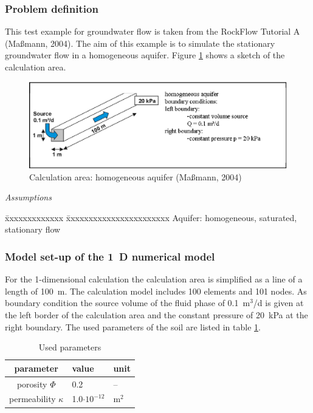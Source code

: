 
\subsubsection*{Problem definition}

This test example for groundwater flow is taken from the RockFlow Tutorial A (Ma{\ss}mann, 2004). The aim of this example is to simulate the stationary groundwater flow in a homogeneous aquifer. Figure \ref{fig21} shows a sketch of the calculation area.
\begin{figure}[htbp]
\centering
\includegraphics[width=1.0\textwidth]{H_GW/figures/fig21.eps}
\caption{Calculation area: homogeneous aquifer (Ma{\ss}mann, 2004)}
\label{fig21}
\end{figure}

\textsl{Assumptions}

\begin{tabbing}
\=xxxxxxxxxxxxx  \=xxxxxxxxxxxxxxxxxxxxxxx \kill
\> Aquifer: \> homogeneous, saturated, stationary flow
\end{tabbing}

\subsubsection*{Model set-up of the 1~D numerical model}

For the 1-dimensional calculation the calculation area is simplified as a line of a length of 100~m. The calculation model includes 100 elements and 101 nodes. As boundary condition the source volume of the fluid phase of 0.1~m$^3$/d is given at the left border of the calculation area and the constant pressure of 20~kPa at the right boundary. The used parameters of the soil are listed in table \ref{tab21}.
\begin{table}[htbp]
\centering
\begin{tabular}{|c|l|l|}
\hline
parameter & value & unit \\
\hline
porosity $\Phi$  & 0.2 &  --  \\			
\hline
permeability $\kappa$ & 1.0$\cdot 10^{-12}$ & m$^2$ \\
\hline
\end{tabular}
\caption{Used parameters}
\label{tab21}
\end{table}

